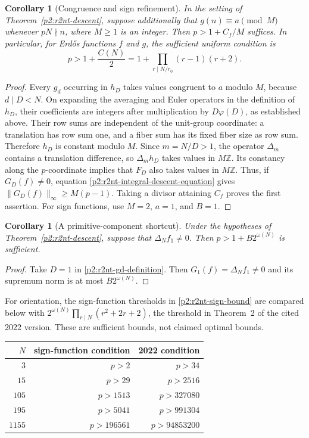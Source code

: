 \documentclass[11pt,a4paper]{article}
\newtheorem{corollary}[theorem]{Corollary}
\theoremstyle{definition}
\theoremstyle{remark}
\numberwithin{equation}{section}
\begin{document}
\begin{corollary}[Congruence and sign refinement]
\label{p2:r2nt-sign-refinement}
In the setting of Theorem~\ref{p2:r2nt-descent}, suppose additionally
that $g(n)\equiv a\pmod M$ whenever $pN\nmid n$, where $M\ge1$
is an integer.  Then $p>1+C_f/M$ suffices.  In particular, for
Erd\H{o}s functions $f$ and $g$, the sufficient uniform condition is
\begin{equation}
\label{p2:r2nt-sign-bound}
 p>1+\frac{C(N)}2
   =1+\prod_{r\mid N/r_0}(r-1)(r+2).
\end{equation}
\end{corollary}
\begin{proof}
Every $g_d$ occurring in $h_D$ takes values congruent to $a$
modulo $M$, because $d\mid D<N$.  On expanding the averaging and
Euler operators in the definition of $h_D$, their coefficients are
integers after multiplication by $D\varphi(D)$, as established above.
Their row sums are independent of the unit-group coordinate: a
translation has row sum one, and a fiber sum has its fixed fiber
size as row sum.  Therefore $h_D$ is constant modulo $M$.
Since $m=N/D>1$, the operator $\Delta_m$ contains a translation
difference, so $\Delta_mh_D$ takes values in $M\mathbb Z$.
Its constancy along the $p$-coordinate implies that $F_D$ also
takes values in $M\mathbb Z$.  Thus, if $G_D(f)\ne0$, equation
\eqref{p2:r2nt-integral-descent-equation} gives
$\|G_D(f)\|_\infty\ge M(p-1)$.
Taking a divisor attaining $C_f$ proves the first assertion.
For sign functions, use $M=2$, $a=1$, and $B=1$.
\end{proof}

\begin{corollary}[A primitive-component shortcut]
\label{p2:r2nt-primitive-shortcut}
Under the hypotheses of Theorem~\ref{p2:r2nt-descent}, suppose that
$\Delta_N f_1\ne0$.  Then $p>1+B2^{\omega(N)}$ is sufficient.
\end{corollary}
\begin{proof}
Take $D=1$ in \eqref{p2:r2nt-gd-definition}.  Then
$G_1(f)=\Delta_N f_1\ne0$ and its supremum norm is at most
$B2^{\omega(N)}$.
\end{proof}

For orientation, the sign-function thresholds in
\eqref{p2:r2nt-sign-bound} are compared below with
$2^{\omega(N)}\prod_{r\mid N}(r^2+2r+2)$, the threshold in
Theorem~2 of the cited 2022 version.  These are sufficient bounds,
not claimed optimal bounds.
\begin{center}
\begin{tabular}{r|r|r}
$N$ & sign-function condition & 2022 condition\\\hline
$3$ & $p>2$ & $p>34$\\
$15$ & $p>29$ & $p>2516$\\
$105$ & $p>1513$ & $p>327080$\\
$195$ & $p>5041$ & $p>991304$\\
$1155$ & $p>196561$ & $p>94853200$
\end{tabular}
\end{center}
\end{document}
